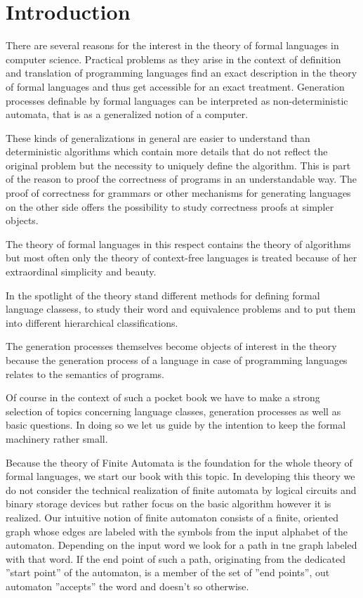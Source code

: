 \chapter*{Introduction}

There are several reasons for the interest in the theory of formal languages in
computer science. Practical problems as they arise in the context of definition
and translation of programming languages find an exact description in the theory
of formal languages and thus get accessible for an exact treatment. Generation
processes definable by formal languages can be interpreted as non-deterministic
automata, that is as a generalized notion of a computer.

These kinds of generalizations in general are easier to understand than
deterministic algorithms which contain more details that do not reflect the
original problem but the necessity to uniquely define the algorithm. This is
part of the reason to proof the correctness of programs in an understandable
way. The proof of correctness for grammars or other mechanisms for generating
languages on the other side offers the possibility to study correctness proofs
at simpler objects.

The theory of formal languages in this respect contains the theory of
algorithms but most often only the theory of context-free languages is treated
because of her extraordinal simplicity and beauty.

In the spotlight of the theory stand different methods for defining formal
language classess, to study their word and equivalence problems and to
put them into different hierarchical classifications.

The generation processes themselves become objects of interest in the theory
because the generation process of a language in case of programming languages
relates to the semantics of programs.

Of course in the context of such a pocket book we have to make a strong
selection of topics concerning language classes, generation processes as well as
basic questions. In doing so we let us guide by the intention to keep the formal
machinery rather small.

Because the theory of Finite Automata is the foundation for the whole theory of
formal languages, we start our book with this topic. In developing this theory
we do not consider the technical realization of finite
automata by logical circuits and binary storage devices but rather focus on the
basic algorithm however it is realized. Our intuitive notion of finite automaton
consists of a finite, oriented graph whose edges are labeled with the symbols
from the input alphabet of the automaton. Depending on the input word we look
for a path in tne graph labeled with that word. If the end point of such a path,
originating from the dedicated ''start point'' of the automaton, is a member of
the set of ''end points'', out automaton ''accepts'' the word and doesn't so
otherwise.

